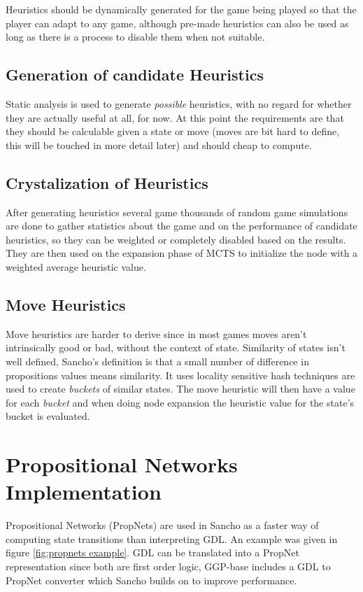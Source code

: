 Heuristics should be dynamically generated for the game being played so that the player can adapt to any game, although pre-made heuristics can also be used as long as there is a process to disable them when not suitable.


\subsection{Generation of candidate Heuristics}
Static analysis is used to generate \textit{possible} heuristics, with no regard for whether they are actually useful at all, for now. At this point the requirements are that they should be calculable given a state or move (moves are bit hard to define, this will be touched in more detail later) and should cheap to compute.


\subsection{Crystalization of Heuristics}
After generating heuristics several game thousands of random game simulations are done to gather statistics about the game and on the performance of candidate heuristics, so they can be weighted or completely disabled based on the results. They are then used  on the expansion phase of MCTS to initialize the node with a weighted average heuristic value.


\subsection{Move Heuristics}
Move heuristics are harder to derive since in most games moves aren't intrinsically good or bad, without the context of state. 
Similarity of states isn't well defined, Sancho's definition is that a small number of difference in propositions values means similarity. 
It uses locality sensitive hash techniques are used to create \textit{buckets} of similar states.
The move heuristic will then have a value for each \textit{bucket} and when doing node expansion the heuristic value for the state's bucket is evaluated.


\section{Propositional Networks Implementation}

Propositional Networks (PropNets) are used in Sancho as a faster way of computing state transitions than interpreting GDL. An example was given in  figure \ref{fig:propnets example}.
GDL can be translated into a PropNet representation since both are first order logic, GGP-base includes a GDL to PropNet converter which Sancho builds on to improve performance.

